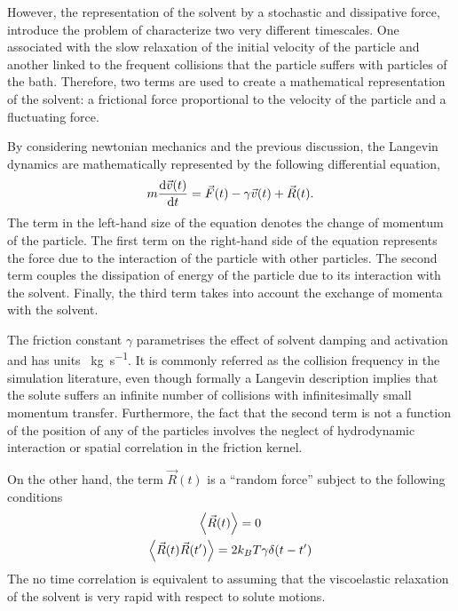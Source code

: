 However, the representation of the solvent by a stochastic and dissipative force, introduce the problem of characterize two very different timescales.
One associated with the slow relaxation of the initial velocity of the particle and another linked to the frequent collisions that the particle suffers with particles of the bath\citep{tsl2006}. 
Therefore, two terms are used to create a mathematical representation of the solvent: a frictional force proportional to the velocity of the particle and a fluctuating force. 

By considering newtonian mechanics and the previous discussion, the Langevin dynamics are mathematically represented by the following differential equation,
\begin{gather}
    m\dv{\vec{v}(t)}{t}=\vec{F}(t)-\gamma\vec{v}(t)+\vec{R}(t).\label{eqn:BrownianDyn1}
\end{gather}
The term in the left-hand size of the equation denotes the change of momentum of the particle.
The first term on the right-hand side of the equation represents the force due to the interaction of the particle with other particles.
The second term couples the dissipation of energy of the particle due to its interaction with the solvent.
Finally, the third term takes into account the exchange of momenta with the solvent.

The friction constant $\gamma$ parametrises the effect of solvent damping and activation and has units \SI{}{\kilo\gram\per\second}.
It is commonly referred as the collision frequency in the simulation literature, even though formally a Langevin description implies that the solute suffers an infinite number of collisions with infinitesimally small momentum transfer.
Furthermore, the fact that the second term is not a function of the position of any of the particles involves the neglect of hydrodynamic interaction or spatial correlation in the friction kernel\citep{pastorTechniquesApplicationsLangevin1994}.

On the other hand, the term $\vec{R}(t)$ is a ``random force'' subject to the following conditions
\begin{gather}
    \expval{\vec{R}(t)} = 0\label{eqn:LagDynamicNoiseExpval} \\
    \expval{\vec{R}(t)\vec{R}(t')} = 2k_{B}T\gamma\delta\qty(t-t')\label{eqn:LagDynamicNoiseCorrelation} 
\end{gather}
The no time correlation is equivalent to assuming that the viscoelastic relaxation of the solvent is very rapid with respect to solute motions\citep{pastorTechniquesApplicationsLangevin1994}.

